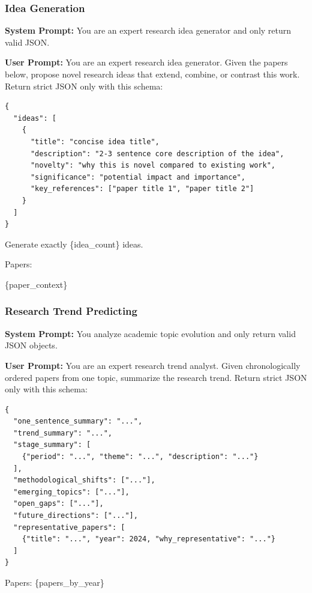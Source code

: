 \documentclass{llmxive}
\begin{document}
\subsubsection{Idea Generation}
\label{prompt:task2-idea-gen}

\begin{tcolorbox}[breakable, colback=magenta!5!white, colframe=magenta!60!black,
  left=1ex, right=1ex, top=0.5ex, bottom=0.5ex,
  fontupper=\small\ttfamily, fontlower=\small\ttfamily,
  title=\textbf{Idea Generation:} Propose novel research ideas from a collection of papers.]
\textbf{System Prompt:}
You are an expert research idea generator and only return valid JSON.

\medskip\textbf{User Prompt:}
You are an expert research idea generator.
Given the papers below, propose novel research ideas that extend, combine, or contrast this work.
Return strict JSON only with this schema:
\begin{verbatim}
{
  "ideas": [
    {
      "title": "concise idea title",
      "description": "2-3 sentence core description of the idea",
      "novelty": "why this is novel compared to existing work",
      "significance": "potential impact and importance",
      "key_references": ["paper title 1", "paper title 2"]
    }
  ]
}
\end{verbatim}

Generate exactly \{idea\_count\} ideas.

Papers:

\{paper\_context\}
\end{tcolorbox}

\subsubsection{Research Trend Predicting}
\label{prompt:task3-trend}

\begin{tcolorbox}[breakable, colback=orange!5!white, colframe=orange!60!black,
  left=1ex, right=1ex, top=0.5ex, bottom=0.5ex,
  fontupper=\small\ttfamily, fontlower=\small\ttfamily,
  title=\textbf{Research Trend Predicting:} Summarize research trends from chronologically ordered papers.]
\textbf{System Prompt:}
You analyze academic topic evolution and only return valid JSON objects.

\medskip\textbf{User Prompt:}
You are an expert research trend analyst.
Given chronologically ordered papers from one topic, summarize the research trend.
Return strict JSON only with this schema:
\begin{verbatim}
{
  "one_sentence_summary": "...",
  "trend_summary": "...",
  "stage_summary": [
    {"period": "...", "theme": "...", "description": "..."}
  ],
  "methodological_shifts": ["..."],
  "emerging_topics": ["..."],
  "open_gaps": ["..."],
  "future_directions": ["..."],
  "representative_papers": [
    {"title": "...", "year": 2024, "why_representative": "..."}
  ]
}
\end{verbatim}

Papers:
\{papers\_by\_year\}
\end{tcolorbox}
\end{document}
